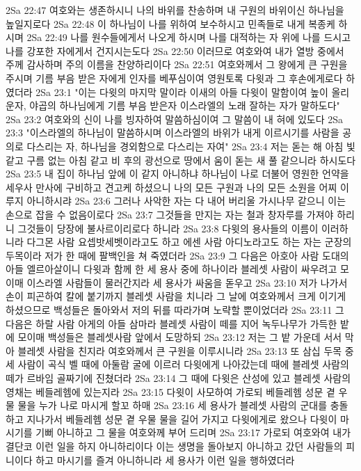 2Sa 22:47  여호와는 생존하시니 나의 바위를 찬송하며 내 구원의 바위이신 하나님을 높일지로다
2Sa 22:48  이 하나님이 나를 위하여 보수하시고 민족들로 내게 복종케 하시며
2Sa 22:49  나를 원수들에게서 나오게 하시며 나를 대적하는 자 위에 나를 드시고 나를 강포한 자에게서 건지시는도다
2Sa 22:50  이러므로 여호와여 내가 열방 중에서 주께 감사하며 주의 이름을 찬양하리이다
2Sa 22:51  여호와께서 그 왕에게 큰 구원을 주시며 기름 부음 받은 자에게 인자를 베푸심이여 영원토록 다윗과 그 후손에게로다 하였더라
2Sa 23:1  "이는 다윗의 마지막 말이라 이새의 아들 다윗이 말함이여 높이 올리운자, 야곱의 하나님에게 기름 부음 받은자 이스라엘의 노래 잘하는 자가 말하도다"
2Sa 23:2  여호와의 신이 나를 빙자하여 말씀하심이여 그 말씀이 내 혀에 있도다
2Sa 23:3  "이스라엘의 하나님이 말씀하시며 이스라엘의 바위가 내게 이르시기를 사람을 공의로 다스리는 자, 하나님을 경외함으로 다스리는 자여"
2Sa 23:4  저는 돋는 해 아침 빛 같고 구름 없는 아침 같고 비 후의 광선으로 땅에서 움이 돋는 새 풀 같으니라 하시도다
2Sa 23:5  내 집이 하나님 앞에 이 같지 아니하냐 하나님이 나로 더불어 영원한 언약을 세우사 만사에 구비하고 견고케 하셨으니 나의 모든 구원과 나의 모든 소원을 어찌 이루지 아니하시랴
2Sa 23:6  그러나 사악한 자는 다 내어 버리울 가시나무 같으니 이는 손으로 잡을 수 없음이로다
2Sa 23:7  그것들을 만지는 자는 철과 창자루를 가져야 하리니 그것들이 당장에 불사르이리로다 하니라
2Sa 23:8  다윗의 용사들의 이름이 이러하니라 다그몬 사람 요셉밧세벳이라고도 하고 에센 사람 아디노라고도 하는 자는 군장의 두목이라 저가 한 때에 팔백인을 쳐 죽였더라
2Sa 23:9  그 다음은 아호아 사람 도대의 아들 엘르아살이니 다윗과 함께 한 세 용사 중에 하나이라 블레셋 사람이 싸우려고 모이매 이스라엘 사람들이 물러간지라 세 용사가 싸움을 돋우고
2Sa 23:10  저가 나가서 손이 피곤하여 칼에 붙기까지 블레셋 사람을 치니라 그 날에 여호와께서 크게 이기게 하셨으므로 백성들은 돌아와서 저의 뒤를 따라가며 노략할 뿐이었더라
2Sa 23:11  그 다음은 하랄 사람 아게의 아들 삼마라 블레셋 사람이 떼를 지어 녹두나무가 가득한 밭에 모이매 백성들은 블레셋사람 앞에서 도망하되
2Sa 23:12  저는 그 밭 가운데 서서 막아 블레셋 사람을 친지라 여호와께서 큰 구원을 이루시니라
2Sa 23:13  또 삼십 두목 중 세 사람이 곡식 벨 때에 아둘람 굴에 이르러 다윗에게 나아갔는데 때에 블레셋 사람의 떼가 르바임 골짜기에 진쳤더라
2Sa 23:14  그 때에 다윗은 산성에 있고 블레셋 사람의 영채는 베들레헴에 있는지라
2Sa 23:15  다윗이 사모하여 가로되 베들레헴 성문 곁 우물 물을 누가 나로 마시게 할꼬 하매
2Sa 23:16  세 용사가 블레셋 사람의 군대를 충돌하고 지나가서 베들레헴 성문 곁 우물 물을 길어 가지고 다윗에게로 왔으나 다윗이 마시기를 기뻐 아니하고 그 물을 여호와께 부어 드리며
2Sa 23:17  가로되 여호와여 내가 결단코 이런 일을 하지 아니하리이다 이는 생명을 돌아보지 아니하고 갔던 사람들의 피니이다 하고 마시기를 즐겨 아니하니라 세 용사가 이런 일을 행하였더라
